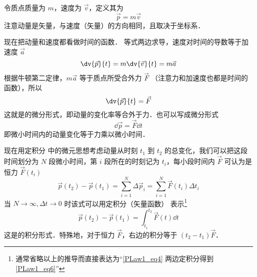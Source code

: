 

令质点质量为 $m$，速度为 $\vec v$，定义其为
\begin{equation}
\vec p = m\vec v
\end{equation}
注意动量是矢量，与速度（矢量）的方向相同，且取决于坐标系．

现在把动量和速度都看做时间的函数． 等式两边求导，速度对时间的导数等于加速度 $\vec a$
\begin{equation}
\dv{\vec p}{t} = m \dv{\vec v}{t} = m\vec a
\end{equation}
根据牛顿第二定律，$m\vec a$ 等于质点所受合外力 $\vec F$ （注意力和加速度也都是时间的函数），所以
\begin{equation}
\dv{\vec p}{t} = \vec F
\end{equation}
这就是的微分形式，即动量的变化率等合外于力．也可以写成微分形式
\begin{equation}\label{PLaw1_eq4}
\dd{\vec p} = \vec F \dd{t}
\end{equation}
即微小时间内的动量变化等于力乘以微小时间．

现在用定积分 中的微元思想考虑动量从时刻 $t_1$ 到 $t_2$ 的总变化，我们可以把这段时间划分为 $N$ 段微小时间，第 $i$ 段所在的时刻记为 $t_i$，每小段时间内 $\vec F$ 可认为是恒力 $\vec F(t_i)$
\begin{equation}
\vec p(t_2)-\vec p(t_1) = \sum_{i=1}^{N} \Delta\vec p_i= \sum_{i=1}^{N} \vec F(t_i) \Delta t_i
\end{equation}
当 $N\to\infty, \Delta t\to 0$ 时该式可以用定积分（矢量函数）%
表示\footnote{通常省略以上的推导而直接表达为“\autoref{PLaw1_eq4} 两边定积分得到\autoref{PLaw1_eq6}”}
\begin{equation}\label{PLaw1_eq6}
\vec p(t_2)-\vec p(t_1) = \int_{t_1}^{t_2}\vec F(t) \dd{t}
\end{equation}
这是的积分形式．特殊地，对于恒力 $\vec F$，右边的积分等于 $(t_2-t_1)\vec F$．